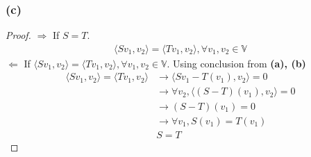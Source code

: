 \documentclass{article}
\newtheorem*{proof}{Proof}
\begin{document}
\subsubsection*{(c)}
\begin{proof}
    \textbf{$\Rightarrow$} If $S = T$.
    \begin{equation*}
        \begin{split}
            \langle Sv_1, v_2  \rangle = \langle Tv_1, v_2  \rangle, \forall v_1, v_2 \in \mathbb{V}
        \end{split}
    \end{equation*}
    \textbf{$\Leftarrow$} If $\langle Sv_1, v_2  \rangle = \langle Tv_1, v_2  \rangle, \forall v_1, v_2 \in \mathbb{V}$. Using conclusion from \textbf{(a), (b)}
    \begin{equation*}
        \begin{split}
            \langle Sv_1, v_2  \rangle = \langle Tv_1, v_2  \rangle &\rightarrow \langle Sv_1 - T(v_1), v_2  \rangle = 0 \\
            &\rightarrow \forall v_2, \langle (S - T)(v_1), v_2  \rangle = 0 \\
            &\rightarrow (S - T)(v_1) = 0 \\
            &\rightarrow \forall v_1 , S(v_1) = T(v_1)\\
            & S = T
        \end{split}
    \end{equation*}

\end{proof}
\end{document}
